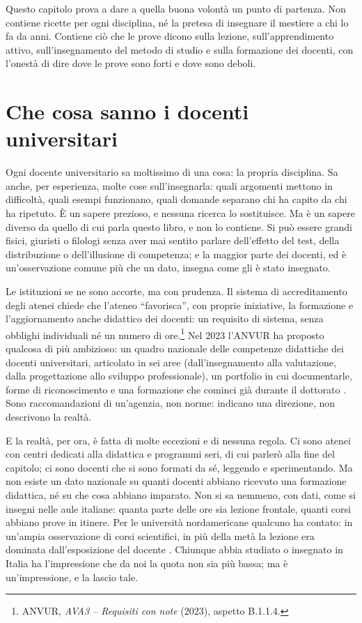 Questo capitolo prova a dare a quella buona volontà un punto di
partenza. Non contiene ricette per ogni disciplina, né la pretesa di
insegnare il mestiere a chi lo fa da anni. Contiene ciò che le prove
dicono sulla lezione, sull'apprendimento attivo, sull'insegnamento
del metodo di studio e sulla formazione dei docenti, con l'onestà di
dire dove le prove sono forti e dove sono deboli.

\section{Che cosa sanno i docenti universitari}

Ogni docente universitario sa moltissimo di una cosa: la propria
disciplina. Sa anche, per esperienza, molte cose sull'insegnarla:
quali argomenti mettono in difficoltà, quali esempi funzionano, quali
domande separano chi ha capito da chi ha ripetuto. È un sapere
prezioso, e nessuna ricerca lo sostituisce. Ma è un sapere diverso da
quello di cui parla questo libro, e non lo contiene. Si può essere
grandi fisici, giuristi o filologi senza aver mai sentito parlare
dell'effetto del test, della distribuzione o dell'illusione di
competenza; e la maggior parte dei docenti, ed è un'osservazione comune più
che un dato, insegna come gli è stato insegnato.

Le istituzioni se ne sono accorte, ma con prudenza. Il sistema di
accreditamento degli atenei chiede che l'ateneo \enquote{favorisca},
con proprie iniziative, la formazione e l'aggiornamento anche
didattico dei docenti: un requisito di sistema, senza obblighi
individuali né un numero di ore.\footnote{ANVUR, \emph{AVA3 --
Requisiti con note} (2023), aspetto B.1.1.4.} Nel 2023 l'ANVUR ha
proposto qualcosa di più ambizioso: un quadro nazionale delle
competenze didattiche dei docenti universitari, articolato in sei
aree (dall'insegnamento alla valutazione, dalla progettazione allo
sviluppo professionale), un portfolio in cui documentarle, forme di
riconoscimento e una formazione che cominci già durante il dottorato
\parencite{anvur2023docenza}. Sono raccomandazioni di un'agenzia, non
norme: indicano una direzione, non descrivono la realtà.

E la realtà, per ora, è fatta di molte eccezioni e di nessuna regola.
Ci sono atenei con centri dedicati alla didattica e programmi seri,
di cui parlerò alla fine del capitolo; ci sono docenti che si sono
formati da sé, leggendo e sperimentando. Ma non esiste un dato
nazionale su quanti docenti abbiano ricevuto una formazione didattica,
né su che cosa abbiano imparato. Non si sa nemmeno, con dati, come
si insegni nelle aule italiane: quanta parte delle ore sia lezione
frontale, quanti corsi abbiano prove in itinere. Per le università
nordamericane qualcuno ha contato: in un'ampia osservazione di corsi
scientifici, in più della metà la lezione era dominata
dall'esposizione del docente \parencite{stains2018}. Chiunque abbia
studiato o insegnato in Italia ha l'impressione che da noi la quota
non sia più bassa; ma è un'impressione, e la lascio tale.

